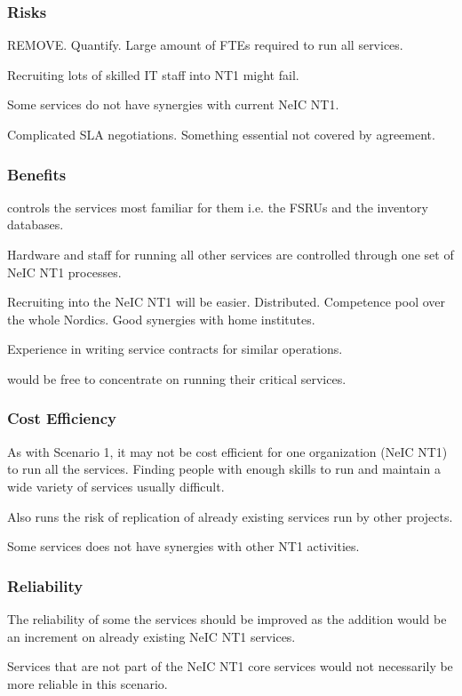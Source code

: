 \documentclass[12pt,a4paper]{article}
\newcommand{\nnt}{NeIC NT1\xspace}
\begin{document}
\subsubsection*{Risks}
\bitm
\item REMOVE. Quantify. Large amount of FTEs required to run all services.
\item Recruiting lots of skilled IT staff into NT1 might fail.
\item Some services do not have synergies with current \nnt.
\item Complicated SLA negotiations. Something essential not covered by agreement.
\eitm

\subsubsection*{Benefits}
\bitm
\item \EC controls the services most familiar for them i.e. the FSRUs and the inventory databases.
\item Hardware and staff for running all other services are controlled through one set of \nnt processes.
\item Recruiting into the \nnt will be easier. Distributed. Competence pool over the whole Nordics. Good synergies with home institutes.
\item Experience in writing service contracts for similar operations.
\item \EC would be free to concentrate on running their critical services.
\eitm

\subsubsection*{Cost Efficiency}
\bitm
\item As with Scenario 1, it may not be cost efficient for one organization (\nnt) to run all the services. Finding people with enough skills to run and maintain a wide variety of services usually difficult.
\item Also runs the risk of replication of already existing services run by other \einfra projects.
\item Some services does not have synergies with other NT1 activities.
\eitm

\subsubsection*{Reliability}
\bitm
\item The reliability of some the services should be improved as the \ED addition would be an increment on already existing \nnt services.
\item Services that are not part of the \nnt core services would not necessarily be more reliable in this scenario.
\eitm
\end{document}
